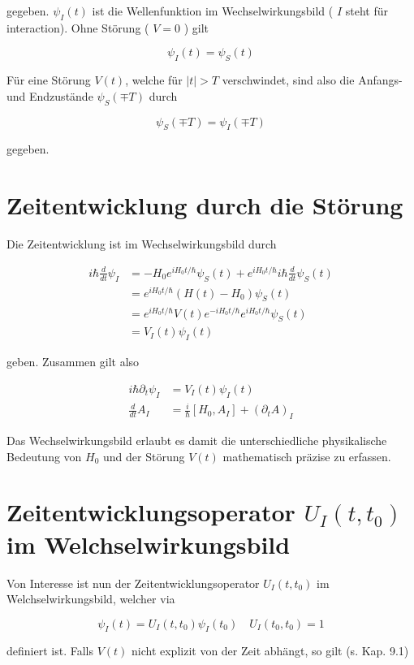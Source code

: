 \documentclass[10pt, letterpaper]{article}
\begin{document}
gegeben. $\psi_{I}(t)$ ist die Wellenfunktion im Wechselwirkungsbild ( $I$ steht für interaction). Ohne Störung ( $V=0$ ) gilt

$$
\psi_{I}(t)=\psi_{S}(t)
$$

Für eine Störung $V(t)$, welche für $|t|>T$ verschwindet, sind also die Anfangs- und Endzustände $\psi_{S}(\mp T)$ durch

$$
\psi_{S}(\mp T)=\psi_{I}(\mp T)
$$

gegeben.

\section*{Zeitentwicklung durch die Störung}
Die Zeitentwicklung ist im Wechselwirkungsbild durch

$$
\begin{aligned}
i \hbar \frac{d}{d t} \psi_{I} & =-H_{0} e^{i H_{0} t / \hbar} \psi_{S}(t)+e^{i H_{0} t / \hbar} i \hbar \frac{d}{d t} \psi_{S}(t) \\
& =e^{i H_{0} t / \hbar}\left(H(t)-H_{0}\right) \psi_{S}(t) \\
& =e^{i H_{0} t / \hbar} V(t) e^{-i H_{0} t / \hbar} e^{i H_{0} t / \hbar} \psi_{S}(t) \\
& =V_{I}(t) \psi_{I}(t)
\end{aligned}
$$

geben. Zusammen gilt also

$$
\begin{aligned}
i \hbar \partial_{t} \psi_{I} & =V_{I}(t) \psi_{I}(t) \\
\frac{d}{d t} A_{I} & =\frac{i}{\hbar}\left[H_{0}, A_{I}\right]+\left(\partial_{t} A\right)_{I}
\end{aligned}
$$

Das Wechselwirkungsbild erlaubt es damit die unterschiedliche physikalische Bedeutung von $H_{0}$ und der Störung $V(t)$ mathematisch präzise zu erfassen.

\section*{Zeitentwicklungsoperator $U_{I}\left(t, t_{0}\right)$ im Welchselwirkungsbild}
Von Interesse ist nun der Zeitentwicklungsoperator $U_{I}\left(t, t_{0}\right)$ im Welchselwirkungsbild, welcher via

$$
\psi_{I}(t)=U_{I}\left(t, t_{0}\right) \psi_{I}\left(t_{0}\right) \quad U_{I}\left(t_{0}, t_{0}\right)=1
$$

definiert ist. Falls $V(t)$ nicht explizit von der Zeit abhängt, so gilt (s. Kap. 9.1)
\end{document}
